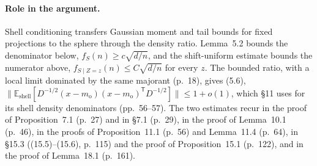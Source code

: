 \documentclass[11pt]{article}
\newcommand{\E}{\mathbb{E}}
\newcommand{\norm}[1]{\lVert #1\rVert}
\newcommand{\ploc}[2]{#1}
\begin{document}
\paragraph{Role in the argument.}
Shell conditioning transfers Gaussian moment and tail bounds for fixed
projections to the sphere through the density ratio. Lemma~5.2 bounds the
denominator below, $f_S(n)\ge c\sqrt{d/n}$, and the shift-uniform estimate
bounds the numerator above, $f_{S\mid Z=z}(n)\le C\sqrt{d/n}$ for every $z$.
The bounded ratio, with a local limit dominated by the same majorant
\ploc{(p.~18)}{profile-spectral.tex:467--483}, gives
\ploc{(5.6)}{profile-spectral.tex:460--465},
$\norm{\E_{\mathrm{shell}}[D^{-1/2}(x-m_{\mathrm o})(x-m_{\mathrm o})^{\mathsf
T}D^{-1/2}]}\le1+o(1)$, which \S11 uses for its shell density denominators
\ploc{(pp.~56--57)}{profile-local.tex:519, 560--562}. The two estimates
recur in the proof of \ploc{Proposition~7.1 (p.~27)}{profile-spectral.tex:1196--1210}
and in \ploc{\S7.1 (p.~29)}{profile-spectral.tex:1355--1362}, in the proof of
\ploc{Lemma~10.1 (p.~46)}{profile-orbits.tex:296--335}, in the proofs of
\ploc{Proposition~11.1 (p.~56)}{profile-local.tex:519--521} and
\ploc{Lemma~11.4 (p.~64)}{profile-local.tex:1113--1123}, in
\ploc{\S15.3 ((15.5)--(15.6), p.~115)}{cap-static.tex:145--211} and the proof of
\ploc{Proposition~15.1 (p.~122)}{cap-static.tex:724--727}, and in the proof of
\ploc{Lemma~18.1 (p.~161)}{cap-initialization.tex:225--241}.
\end{document}
